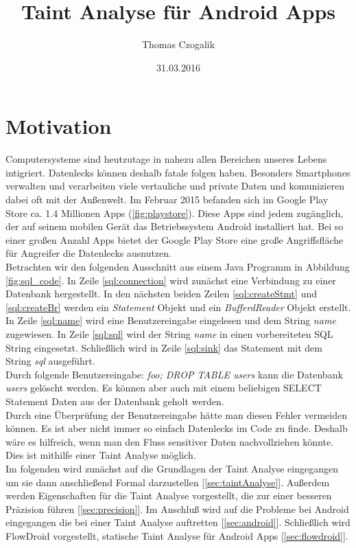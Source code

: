 \documentclass[runningheads]{llncs}
\begin{document}
\mainmatter
\title{Taint Analyse für Android Apps} 
\author{Thomas Czogalik}
\date{31.03.2016}
\maketitle

\section{Motivation} 
Computersysteme sind heutzutage in nahezu allen Bereichen unseres Lebens intigriert. Datenlecks können deshalb fatale folgen haben. Besonders Smartphones verwalten und verarbeiten viele vertauliche und private Daten und komunizieren dabei oft mit der Außenwelt. Im Februar 2015 befanden sich im Google Play Store ca. 1.4 Millionen Apps (\ref{fig:playstore}). Diese Apps sind jedem zugänglich, der auf seinem mobilen Gerät das Betriebssystem Android installiert hat. Bei so einer großen Anzahl Apps bietet der Google Play Store eine große Angriffsfläche für Angreifer die Datenlecks ausnutzen. \\
Betrachten wir den folgenden Ausschnitt aus einem Java Programm in Abbildung \ref{fig:sql_code}. In Zeile \ref{sql:connection} wird zunächst eine Verbindung zu einer Datenbank hergestellt. In den nächsten beiden Zeilen \ref{sql:createStmt} und \ref{sql:createBr} werden ein \emph{Statement} Objekt und ein \emph{BufferdReader} Objekt erstellt. In Zeile \ref{sql:name} wird eine Benutzereingabe eingelesen und dem String \emph{name} zugewiesen. In Zeile \ref{sql:sql} wird der String \emph{name} in einen vorbereiteten SQL String eingesetzt. Schließlich wird in Zeile \ref{sql:sink} das Statement mit dem String \emph{sql} ausgeführt. 
\\Durch folgende Benutzereingabe: \emph{foo; DROP TABLE users} kann die Datenbank \emph{users} gelöscht werden. Es können aber auch mit einem beliebigen SELECT Statement Daten aus der Datenbank geholt werden. 
\\Durch eine Überprüfung der Benutzereingabe hätte man diesen Fehler vermeiden können. Es ist aber nicht immer so einfach Datenlecks im Code zu finde. 
Deshalb wäre es hilfreich, wenn man den Fluss sensitiver Daten nachvollziehen könnte. Dies ist mithilfe einer Taint Analyse möglich. \\
Im folgenden wird zunächst auf die Grundlagen der Taint Analyse eingegangen um sie dann anschließend Formal darzustellen [\ref{sec:taintAnalyse}]. Außerdem werden Eigenschaften für die Taint Analyse vorgestellt, die zur einer besseren Präzision führen [\ref{sec:precision}]. Im Anschluß wird auf die Probleme bei Android eingegangen die bei einer Taint Analyse auftretten [\ref{sec:android}]. Schließlich wird FlowDroid vorgestellt, statische Taint Analyse für Android Apps [\ref{sec:flowdroid}].
 
\end{document}
